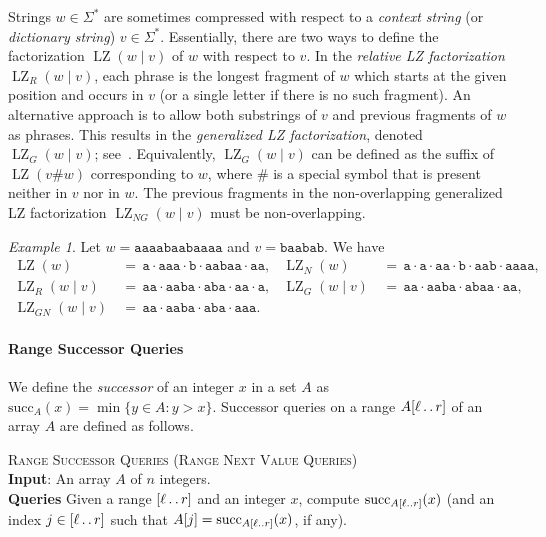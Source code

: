 \documentclass[a4paper]{article}
\theoremstyle{definition}
\theoremstyle{remark}
\newtheorem{example}[theorem]{Example}
\newcommand{\LZ}{\operatorname{LZ}}
\newcommand{\dd}{\mathinner{\ldotp\ldotp}}
\newcommand{\suc}{\mathrm{succ}}
\newenvironment{dsproblem}[1]
{\begin{center}\begin{lrbox}{\mybox}\begin{minipage}{0.96\columnwidth}{\textsc{#1}}\\}
{\end{minipage}\end{lrbox}\fbox{\usebox{\mybox}}\end{center}}
\newcommand{\defdsproblem}[2]{
  \begin{dsproblem}{#1}
#2
  \end{dsproblem}
  }
\begin{document}
Strings $w\in \Sigma^*$ are sometimes compressed with respect to a \emph{context string} (or \emph{dictionary string}) $v\in \Sigma^*$.
Essentially, there are two ways to define the factorization $\LZ(w \mid v)$ of $w$ with respect to $v$.
In the \emph{relative LZ factorization}~\cite{DBLP:journals/tit/ZivM93,DBLP:conf/spire/KuruppuPZ10} $\LZ_R(w \mid v)$, each phrase is the longest fragment of $w$ which starts at the given position and occurs in $v$ (or a single letter if there is no such fragment).
An alternative approach is to allow both substrings of $v$ and previous fragments of $w$ as phrases. This results in the \emph{generalized LZ factorization}, denoted $\LZ_G(w \mid v)$; see~\cite{DBLP:conf/soda/CormodeM05,DBLP:journals/tcs/KellerKFL14}.
Equivalently,  $\LZ_G(w \mid v)$ can be defined as the suffix of $\LZ(v\#w)$ corresponding to $w$, where $\#$ is a special symbol that is present neither in $v$ nor in $w$.
The previous fragments in the non-overlapping generalized LZ factorization $\LZ_{NG}(w \mid v)$ must be non-overlapping.
\begin{example}
Let $w=\mathtt{aaaabaabaaaa}$ and $v=\mathtt{baabab}$.
We have
\begin{align*}
\LZ(w)\,&=\, \mathtt{a}\cdot \mathtt{aaa}\cdot \mathtt{b}\cdot \mathtt{aabaa}\cdot\mathtt{aa},&
\LZ_N(w)\,&=\, \mathtt{a}\cdot \mathtt{a}\cdot \mathtt{aa}\cdot \mathtt{b}\cdot \mathtt{aab}\cdot\mathtt{aaaa},\\
\LZ_R(w\mid v)\,&=\, \mathtt{aa}\cdot\mathtt{aaba}\cdot \mathtt{aba}\cdot \mathtt{aa}\cdot \mathtt{a},&
\LZ_{G}(w\mid v)\,&=\, \mathtt{aa}\cdot \mathtt{aaba}\cdot \mathtt{abaa}\cdot\mathtt{aa},\\
\LZ_{GN}(w\mid v)\,&=\, \mathtt{aa}\cdot \mathtt{aaba}\cdot \mathtt{aba} \cdot \mathtt{aaa}.
\end{align*}
\end{example}

\paragraph{Range Successor Queries}
We define the \emph{successor} of an integer $x$ in a set $A$ as
$\suc_{A}(x)=\min\{y\in A : y > x\}$.
Successor queries on a range $A[\ell \dd r]$ of an array $A$ are defined as follows.
\defdsproblem{\textsc{Range Successor Queries (Range Next Value Queries)}}{
  \textbf{Input}: An array $A$ of $n$ integers.\\
\textbf{Queries} Given a range $[\ell \dd r]$ and an integer $x$, compute $\suc_{A[\ell \dd r]}(x)$ (and an index $j\in [\ell\dd r]$ such that $A[j]=\suc_{A[\ell \dd r]}(x)$, if any).}
\end{document}
